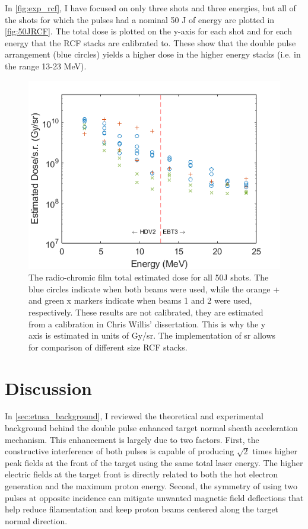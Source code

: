 In \autoref{fig:exp_rcf}, I have focused on only three shots and three energies, but all of the shots for which the pulses had a nominal 50 J of energy are plotted in \autoref{fig:50JRCF}. The total dose is plotted on the y-axis for each shot and for each energy that the \gls{RCF} stacks are calibrated to. These show that the double pulse arrangement (blue circles) yields a higher dose in the higher energy stacks (i.e. in the range 13-23 MeV). 

\begin{figure}
	\centering
	\includegraphics[width=0.75\linewidth]{planning/images/titan/50JRCFcompNew.png}
	\caption{The radio-chromic film total estimated dose for all 50J shots. The blue circles indicate when both beams were used, while the orange + and green x markers indicate when beams 1 and 2 were used, respectively. These results are not calibrated, they are estimated from a calibration in Chris Willis' dissertation. This is why the y axis is estimated in units of Gy/sr. The implementation of sr allows for comparison of different size RCF stacks.}
	\label{fig:50JRCF}
\end{figure}

\section{Discussion}

In \autoref{sec:etnsa_background}, I reviewed the theoretical and experimental background behind the double pulse enhanced target normal sheath acceleration mechanism. This enhancement is largely due to two factors. First, the constructive interference of both pulses is capable of producing $\sqrt{2}$ times higher peak fields at the front of the target using the same total laser energy. The higher electric fields at the target front is directly related to both the hot electron generation and the maximum proton energy. Second, the symmetry of using two pulses at opposite incidence can mitigate unwanted magnetic field deflections that help reduce filamentation and keep proton beams centered along the target normal direction. 

